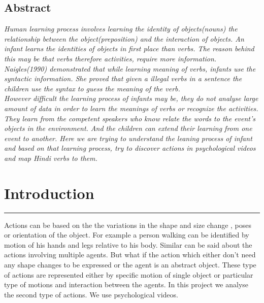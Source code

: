 \def\DevnagVersion{2.15}\documentclass[a4paper, 10pt, notitlepage]{report}
\begin{document}
\tableofcontents 

\newpage
\section*{Abstract}
{\it
Human learning process involves learning the identity of objects(nouns) the relationship between the object(preposition) and the interaction of objects. An infant learns the identities of objects in first place than verbs. The reason behind this may be that verbs therefore activities, require more information. Naigles(1990)\cite{naigles} demonstrated that while learning meaning of verbs, infants use the syntactic information. She proved that given a illegal verbs in a sentence the children use the syntax to guess the meaning of the verb. \\
\hspace*{10pt} However difficult the learning process of infants may be, they do not analyse large amount of data in order to learn the meanings of verbs or recognize the activities. They learn from the competent speakers who know relate the words to the event's objects in the environment.\cite{kerr-cohen-08_wubble-world-lang-acquisition} And the children can extend their learning from one event to another. 
\hspace*{10pt} Here we are trying to understand the leaning process of infant and based on that learning process, try to discover actions in psychological videos and map Hindi verbs to them.
}

\chapter{Introduction}
\hrule height 2pt
\vspace*{10pt} 
 Actions can be based on the the variations in the shape and size change , poses\cite{pami-Ben-ArieWPR02}  or orientation of the object. For example a person walking can be identified by motion of his hands and legs relative to his body. Similar can be said about the actions involving multiple agents. But what if the action which either don't need any shape changes to be expressed or the agent is an abstract object. These type of actions are represented either by specific motion of single object or particular type of motions and interaction between the agents. In this project we analyse the second type of actions. We use psychological videos\cite{fhanimation}. \\
\end{document}
